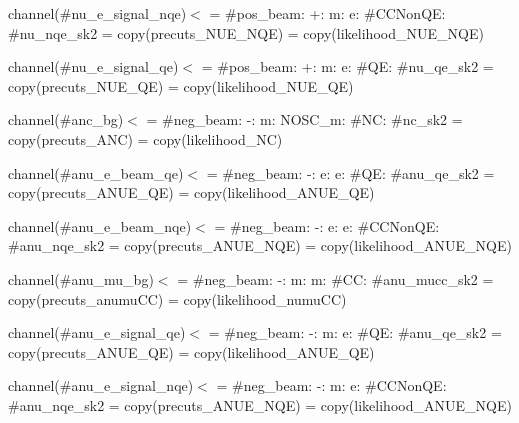 channel(\#nu\+\_\+e\+\_\+signal\+\_\+nqe)$<$  = \#pos\+\_\+beam\+: +\+: m\+: e\+: \#\+C\+C\+Non\+QE\+: \#nu\+\_\+nqe\+\_\+sk2  = copy(precuts\+\_\+\+N\+U\+E\+\_\+\+N\+QE)  = copy(likelihood\+\_\+\+N\+U\+E\+\_\+\+N\+QE) \begin{quote}


\end{quote}
channel(\#nu\+\_\+e\+\_\+signal\+\_\+qe)$<$  = \#pos\+\_\+beam\+: +\+: m\+: e\+: \#\+QE\+: \#nu\+\_\+qe\+\_\+sk2  = copy(precuts\+\_\+\+N\+U\+E\+\_\+\+QE)  = copy(likelihood\+\_\+\+N\+U\+E\+\_\+\+QE) \begin{quote}


\end{quote}


channel(\#anc\+\_\+bg)$<$  = \#neg\+\_\+beam\+: -\/\+: m\+: N\+O\+S\+C\+\_\+m\+: \#\+NC\+: \#nc\+\_\+sk2  = copy(precuts\+\_\+\+A\+NC)  = copy(likelihood\+\_\+\+NC) \begin{quote}


\end{quote}
channel(\#anu\+\_\+e\+\_\+beam\+\_\+qe)$<$  = \#neg\+\_\+beam\+: -\/\+: e\+: e\+: \#\+QE\+: \#anu\+\_\+qe\+\_\+sk2  = copy(precuts\+\_\+\+A\+N\+U\+E\+\_\+\+QE)  = copy(likelihood\+\_\+\+A\+N\+U\+E\+\_\+\+QE) \begin{quote}


\end{quote}
channel(\#anu\+\_\+e\+\_\+beam\+\_\+nqe)$<$  = \#neg\+\_\+beam\+: -\/\+: e\+: e\+: \#\+C\+C\+Non\+QE\+: \#anu\+\_\+nqe\+\_\+sk2  = copy(precuts\+\_\+\+A\+N\+U\+E\+\_\+\+N\+QE)  = copy(likelihood\+\_\+\+A\+N\+U\+E\+\_\+\+N\+QE) \begin{quote}


\end{quote}
channel(\#anu\+\_\+mu\+\_\+bg)$<$  = \#neg\+\_\+beam\+: -\/\+: m\+: m\+: \#\+CC\+: \#anu\+\_\+mucc\+\_\+sk2  = copy(precuts\+\_\+anumu\+CC)  = copy(likelihood\+\_\+numu\+CC) \begin{quote}


\end{quote}
channel(\#anu\+\_\+e\+\_\+signal\+\_\+qe)$<$  = \#neg\+\_\+beam\+: -\/\+: m\+: e\+: \#\+QE\+: \#anu\+\_\+qe\+\_\+sk2  = copy(precuts\+\_\+\+A\+N\+U\+E\+\_\+\+QE)  = copy(likelihood\+\_\+\+A\+N\+U\+E\+\_\+\+QE) \begin{quote}


\end{quote}
channel(\#anu\+\_\+e\+\_\+signal\+\_\+nqe)$<$  = \#neg\+\_\+beam\+: -\/\+: m\+: e\+: \#\+C\+C\+Non\+QE\+: \#anu\+\_\+nqe\+\_\+sk2  = copy(precuts\+\_\+\+A\+N\+U\+E\+\_\+\+N\+QE)  = copy(likelihood\+\_\+\+A\+N\+U\+E\+\_\+\+N\+QE) \begin{quote}


\end{quote}


